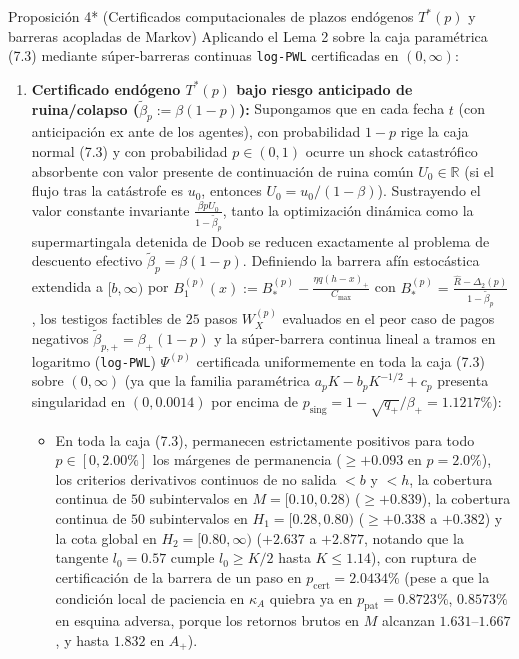 \documentclass[11pt,letterpaper]{article}
\theoremstyle{plain}
\newtheorem*{namedthm}{\protect\namedthmname}
\newcommand{\namedthmname}{}
\newenvironment{thm_box}[1]{\renewcommand{\namedthmname}{#1}\begin{namedthm}}{\end{namedthm}}
\begin{document}
\begin{thm_box}{Proposición 4* (Certificados computacionales de plazos endógenos $T^*(p)$ y barreras acopladas de Markov)}
Aplicando el Lema 2 sobre la caja paramétrica (7.3) mediante súper-barreras continuas \texttt{log-PWL} certificadas en $(0,\infty)$:
\begin{enumerate}
\item \textbf{Certificado endógeno $T^*(p)$ bajo riesgo anticipado de ruina/colapso ($\tilde{\beta}_p:=\beta(1-p)$):} Supongamos que en cada fecha $t$ (con anticipación ex ante de los agentes), con probabilidad $1-p$ rige la caja normal (7.3) y con probabilidad $p\in(0,1)$ ocurre un shock catastrófico absorbente con valor presente de continuación de ruina común $U_0\in\mathbb{R}$ (si el flujo tras la catástrofe es $u_0$, entonces $U_0=u_0/(1-\beta)$). Sustrayendo el valor constante invariante $\frac{\beta p U_0}{1-\tilde{\beta}_p}$, tanto la optimización dinámica como la supermartingala detenida de Doob se reducen exactamente al problema de descuento efectivo $\tilde{\beta}_p=\beta(1-p)$. Definiendo la barrera afín estocástica extendida a $[b,\infty)$ por $B_1^{(p)}(x):=B_*^{(p)}-\frac{\eta q(h-x)_+}{C_{\max}}$ con $B_*^{(p)}=\frac{\widehat{R}-\Delta_2(p)}{1-\tilde{\beta}_p}$, los testigos factibles de $25$ pasos $W_X^{(p)}$ evaluados en el peor caso de pagos negativos $\tilde{\beta}_{p,+}=\beta_+(1-p)$ y la súper-barrera continua lineal a tramos en logaritmo (\texttt{log-PWL}) $\Psi^{(p)}$ certificada uniformemente en toda la caja (7.3) sobre $(0,\infty)$ (ya que la familia paramétrica $a_p K - b_p K^{-1/2} + c_p$ presenta singularidad en $(0,0.0014)$ por encima de $p_{\mathrm{sing}} = 1-\sqrt{q_+}/\beta_+ = 1.1217\%$):
\begin{itemize}
\item En toda la caja (7.3), permanecen estrictamente positivos para todo $p\in[0,2.00\%]$ los márgenes de permanencia ($\ge +0.093$ en $p=2.0\%$), los criterios derivativos continuos de no salida $<b$ y $<h$, la cobertura continua de $50$ subintervalos en $M=[0.10,0.28)$ ($\ge +0.839$), la cobertura continua de $50$ subintervalos en $H_1=[0.28,0.80)$ ($\ge +0.338$ a $+0.382$) y la cota global en $H_2=[0.80,\infty)$ ($+2.637$ a $+2.877$, notando que la tangente $l_0=0.57$ cumple $l_0\ge K/2$ hasta $K\le 1.14$), con ruptura de certificación de la barrera de un paso en \textbf{$p_{\mathrm{cert}} = 2.0434\%$} (pese a que la condición local de paciencia en $\kappa_A$ quiebra ya en $p_{\mathrm{pat}}=0.8723\%$, $0.8573\%$ en esquina adversa, porque los retornos brutos en $M$ alcanzan $1.631$--$1.667$, y hasta $1.832$ en $A_+$).

\end{itemize}
\end{enumerate}
\end{thm_box}
\end{document}
